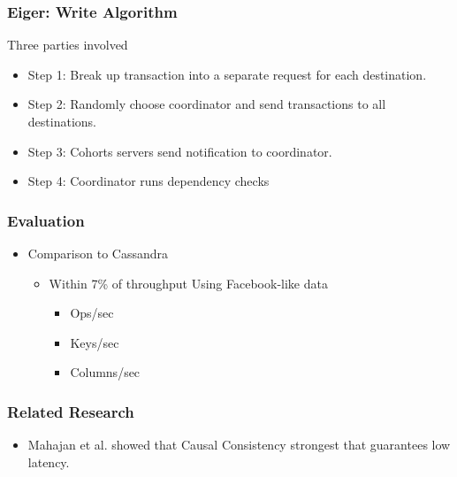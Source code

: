 \documentclass{beamer}
\begin{document}
\begin{frame}
\frametitle{Eiger: Write Algorithm}
Three parties involved
\begin{itemize}
	\item Step 1: Break up transaction into a separate request for each destination.
	\item Step 2: Randomly choose coordinator and send transactions to all destinations.
	\item Step 3: Cohorts servers send notification to coordinator.
	\item Step 4: Coordinator runs dependency checks
\end{itemize}  
\end{frame}

\begin{frame}
\frametitle{Evaluation}
\begin{itemize}
\pause \item Comparison to Cassandra
		\begin{itemize}
			\item Within 7\% of throughput Using Facebook-like data
			\begin{itemize}
				\item Ops/sec
				\item Keys/sec
				\item Columns/sec
			\end{itemize}
		\end{itemize}
\end{itemize}  
\end{frame}

\begin{frame}
\frametitle{Related Research}
\begin{itemize}
\pause \item Mahajan et al. showed that Causal Consistency strongest that guarantees low latency.
\end{itemize}  
\end{frame}
\end{document}
